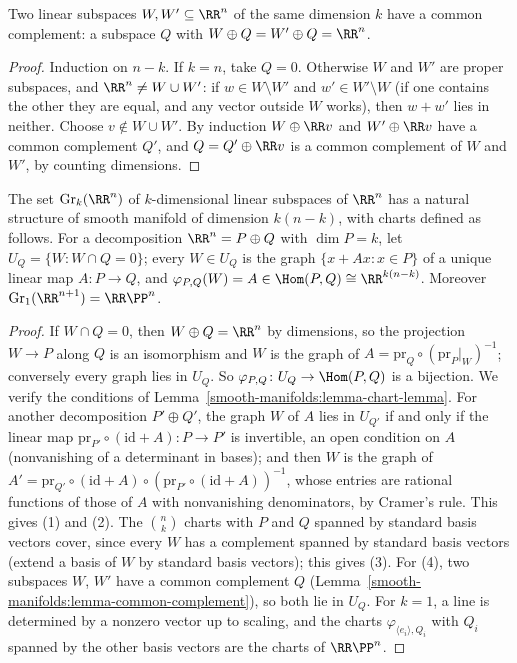 \begin{lemma}\label{smooth-manifolds:lemma-common-complement}
Two linear subspaces $W, W' \subseteq \RR^n$ of the same dimension $k$ have a common complement: a subspace $Q$ with $W \oplus Q = W' \oplus Q = \RR^n$.
\end{lemma}

\begin{proof}
Induction on $n - k$. If $k = n$, take $Q = 0$. Otherwise $W$ and $W'$ are proper subspaces, and $\RR^n \neq W \cup W'$: if $w \in W \setminus W'$ and $w' \in W' \setminus W$ (if one contains the other they are equal, and any vector outside
$W$ works), then $w + w'$ lies in neither. Choose $v \notin W \cup W'$. By induction $W \oplus \RR v$ and $W' \oplus \RR v$ have a common complement $Q'$, and $Q = Q' \oplus \RR v$ is a common complement of $W$ and $W'$, by counting
dimensions.
\end{proof}

\begin{proposition}\label{smooth-manifolds:proposition-grassmannian}
The set $\mathrm{Gr}_k(\RR^n)$ of $k$-dimensional linear subspaces of $\RR^n$ has a natural structure of smooth manifold of dimension $k(n - k)$, with charts defined as follows. For a decomposition $\RR^n = P \oplus Q$ with
$\dim P = k$, let $U_Q = \{W : W \cap Q = 0\}$; every $W \in U_Q$ is the graph $\{x + Ax : x \in P\}$ of a unique linear map $A \colon P \to Q$, and $\varphi_{P,Q}(W) = A \in \Hom(P, Q) \cong \RR^{k(n-k)}$. Moreover
$\mathrm{Gr}_1(\RR^{n+1}) = \RR\PP^n$.
\end{proposition}

\begin{proof}
If $W \cap Q = 0$, then $W \oplus Q = \RR^n$ by dimensions, so the projection $W \to P$ along $Q$ is an isomorphism and $W$ is the graph of $A = \mathrm{pr}_Q \circ (\mathrm{pr}_P|_W)^{-1}$; conversely every graph lies in $U_Q$. So
$\varphi_{P,Q} \colon U_Q \to \Hom(P, Q)$ is a bijection. We verify the conditions of Lemma~\ref{smooth-manifolds:lemma-chart-lemma}. For another decomposition $P' \oplus Q'$, the graph $W$ of $A$ lies in $U_{Q'}$ if and only if the
linear map $\mathrm{pr}_{P'} \circ (\mathrm{id} + A) \colon P \to P'$ is invertible, an open condition on $A$ (nonvanishing of a determinant in bases); and then $W$ is the graph of
$A' = \mathrm{pr}_{Q'} \circ (\mathrm{id} + A) \circ (\mathrm{pr}_{P'} \circ (\mathrm{id} + A))^{-1}$, whose entries are rational functions of those of $A$ with nonvanishing denominators, by Cramer's rule. This gives (1) and (2). The
$\binom nk$ charts with $P$ and $Q$ spanned by standard basis vectors cover, since every $W$ has a complement spanned by standard basis vectors (extend a basis of $W$ by standard basis vectors); this gives (3). For (4), two
subspaces $W$, $W'$ have a common complement $Q$ (Lemma~\ref{smooth-manifolds:lemma-common-complement}), so both lie in $U_Q$. For $k = 1$, a line is determined by a nonzero vector up to scaling, and the charts
$\varphi_{\langle e_i\rangle, Q_i}$ with $Q_i$ spanned by the other basis vectors are the charts of $\RR\PP^n$.
\end{proof}

